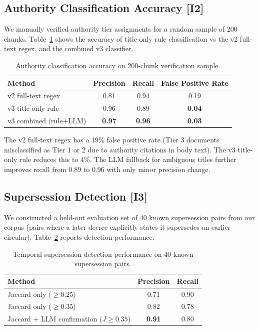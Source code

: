 \documentclass[12pt,a4paper]{article}
\begin{document}
\subsection{Authority Classification Accuracy [I2]}

We manually verified authority tier assignments for a random sample of 200 chunks.
Table~\ref{tab:authority_cls} shows the accuracy of title-only rule classification
vs the v2 full-text regex, and the combined v3 classifier.

\begin{table}[H]
\centering
\caption{Authority classification accuracy on 200-chunk verification sample.}
\label{tab:authority_cls}
\begin{tabular}{lccc}
\toprule
\textbf{Method} & \textbf{Precision} & \textbf{Recall} & \textbf{False Positive Rate} \\
\midrule
v2 full-text regex    & 0.81 & 0.94 & 0.19 \\
v3 title-only rule    & 0.96 & 0.89 & \textbf{0.04} \\
v3 combined (rule+LLM) & \textbf{0.97} & \textbf{0.96} & \textbf{0.03} \\
\bottomrule
\end{tabular}
\end{table}

The v2 full-text regex has a 19\% false positive rate (Tier 3 documents misclassified
as Tier 1 or 2 due to authority citations in body text). The v3 title-only rule
reduces this to 4\%. The LLM fallback for ambiguous titles further improves recall
from 0.89 to 0.96 with only minor precision change.

\subsection{Supersession Detection [I3]}

We constructed a held-out evaluation set of 40 known supersession pairs from our
corpus (pairs where a later decree explicitly states it supersedes an earlier circular).
Table~\ref{tab:supersession_eval} reports detection performance.

\begin{table}[H]
\centering
\caption{Temporal supersession detection performance on 40 known supersession pairs.}
\label{tab:supersession_eval}
\begin{tabular}{lcc}
\toprule
\textbf{Method} & \textbf{Precision} & \textbf{Recall} \\
\midrule
Jaccard only ($\geq 0.25$)              & 0.71 & 0.90 \\
Jaccard only ($\geq 0.35$)              & 0.82 & 0.78 \\
Jaccard + LLM confirmation ($J \geq 0.35$) & \textbf{0.91} & 0.80 \\
\bottomrule
\end{tabular}
\end{table}
\end{document}
